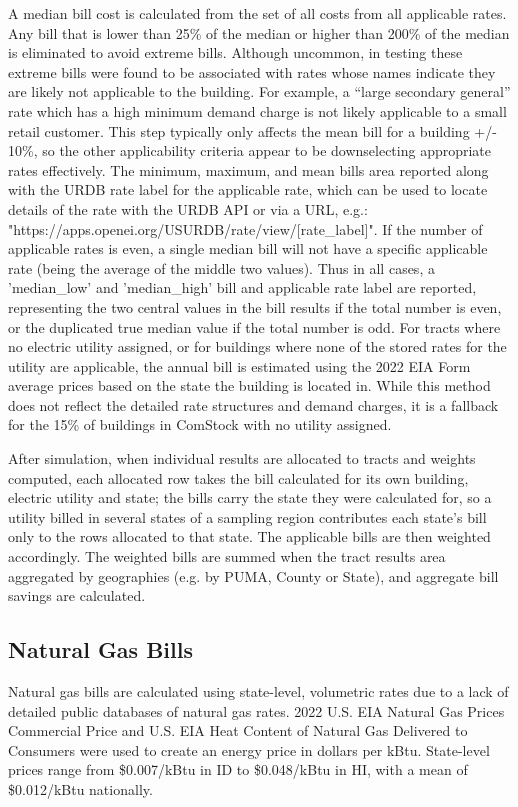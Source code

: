 A median bill cost is calculated from the set of all costs from all applicable rates. Any bill that is lower than 25\% of the median or higher than 200\% of the median is eliminated to avoid extreme bills. Although uncommon, in testing these extreme bills were found to be associated with rates whose names indicate they are likely not applicable to the building. For example, a ``large secondary general'' rate which has a high minimum demand charge is not likely applicable to a small retail customer. This step typically only affects the mean bill for a building +/- 10\%, so the other applicability criteria appear to be downselecting appropriate rates effectively. The minimum, maximum, and mean bills area reported along with the URDB rate label for the applicable rate, which can be used to locate details of the rate with the URDB API or via a URL, e.g.: "https://apps.openei.org/USURDB/rate/view/[rate\_label]". If the number of applicable rates is even, a single median bill will not have a specific applicable rate (being the average of the middle two values). Thus in all cases, a 'median\_low' and 'median\_high' bill and applicable rate label are reported, representing the two central values in the bill results if the total number is even, or the duplicated true median value if the total number is odd.
For tracts where no electric utility assigned, or for buildings where none of the stored rates for the utility are applicable, the annual bill is estimated using the 2022 EIA Form \citep{eia_electricity} average prices based on the state the building is located in. While this method does not reflect the detailed rate structures and demand charges, it is a fallback for the 15\% of buildings in ComStock with no utility assigned.

After simulation, when individual results are allocated to tracts and weights computed, each allocated row takes the bill calculated for its own building, electric utility and state; the bills carry the state they were calculated for, so a utility billed in several states of a sampling region contributes each state's bill only to the rows allocated to that state. The applicable bills are then weighted accordingly. The weighted bills are summed when the tract results area aggregated by geographies (e.g. by PUMA, County or State), and aggregate bill savings are calculated. 

\subsection{Natural Gas Bills}
Natural gas bills are calculated using state-level, volumetric rates due to a lack of detailed public databases of natural gas rates. 2022 U.S. EIA Natural Gas Prices \- Commercial Price and U.S. EIA Heat Content of Natural Gas Delivered to Consumers \citep{eia_natural_gas} were used to create an energy price in dollars per kBtu. State-level prices range from \$0.007/kBtu in ID to \$0.048/kBtu in HI, with a mean of \$0.012/kBtu nationally.

